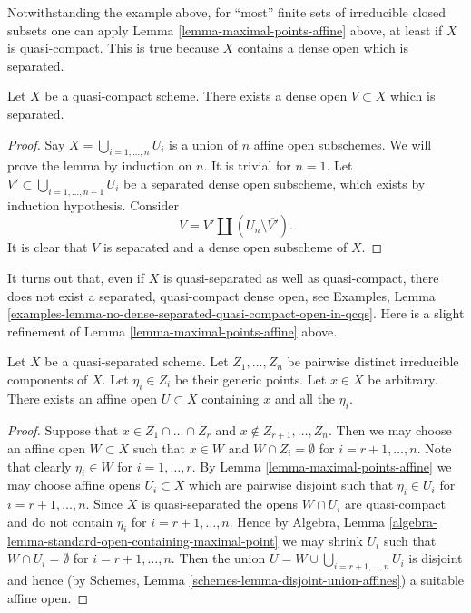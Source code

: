 \noindent
Notwithstanding the example above, for ``most'' finite sets of irreducible
closed subsets one can apply Lemma \ref{lemma-maximal-points-affine} above,
at least if $X$ is quasi-compact. This is true because $X$ contains a dense
open which is separated.

\begin{lemma}
\label{lemma-quasi-compact-dense-open-separated}
Let $X$ be a quasi-compact scheme.
There exists a dense open $V \subset X$ which is separated.
\end{lemma}

\begin{proof}
Say $X = \bigcup_{i = 1, \ldots, n} U_i$ is a union of $n$ affine open
subschemes. We will prove the lemma by induction on $n$. It is trivial for
$n = 1$. Let $V' \subset \bigcup_{i = 1, \ldots, n - 1} U_i$ be a separated
dense open subscheme, which exists by induction hypothesis. Consider
$$
V = V' \amalg (U_n \setminus \overline{V'}).
$$
It is clear that $V$ is separated and a dense open subscheme of $X$.
\end{proof}

\noindent
It turns out that, even if $X$ is quasi-separated as well as quasi-compact,
there does not exist a separated, quasi-compact dense open, see
Examples, Lemma
\ref{examples-lemma-no-dense-separated-quasi-compact-open-in-qcqs}.
Here is a slight refinement of Lemma \ref{lemma-maximal-points-affine} above.

\begin{lemma}
\label{lemma-point-and-maximal-points-affine}
Let $X$ be a quasi-separated scheme. Let $Z_1, \ldots, Z_n$ be pairwise
distinct irreducible components of $X$. Let $\eta_i \in Z_i$ be their
generic points. Let $x \in X$ be arbitrary.
There exists an affine open $U \subset X$ containing
$x$ and all the $\eta_i$.
\end{lemma}

\begin{proof}
Suppose that $x \in Z_1 \cap \ldots \cap Z_r$ and
$x \not \in Z_{r + 1}, \ldots, Z_n$. Then we may choose
an affine open $W \subset X$ such that
$x \in W$ and $W \cap Z_i = \emptyset$ for
$i = r + 1, \ldots, n$. Note that clearly $\eta_i \in W$
for $i = 1, \ldots, r$. By Lemma \ref{lemma-maximal-points-affine}
we may choose affine opens $U_i \subset X$ which are pairwise
disjoint such that $\eta_i \in U_i$ for $i = r + 1, \ldots, n$.
Since $X$ is quasi-separated the opens $W \cap U_i$
are quasi-compact and do not contain $\eta_i$ for
$i = r + 1, \ldots, n$. Hence by
Algebra, Lemma \ref{algebra-lemma-standard-open-containing-maximal-point}
we may shrink $U_i$ such that $W \cap U_i = \emptyset$
for $i = r + 1, \ldots, n$. Then the union
$U = W \cup \bigcup_{i = r + 1, \ldots, n} U_i$ is disjoint and hence
(by Schemes, Lemma \ref{schemes-lemma-disjoint-union-affines})
a suitable affine open.
\end{proof}

